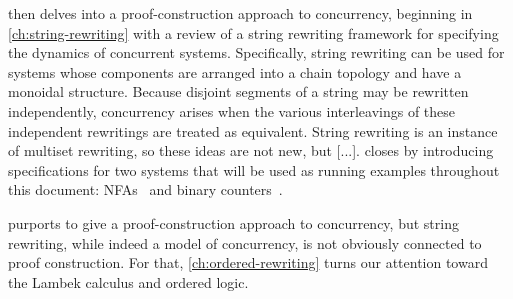  then delves into a proof-construction approach to concurrency, beginning in \cref{ch:string-rewriting} with a review of a string rewriting framework for specifying the dynamics of concurrent systems.
Specifically, string rewriting can be used for systems whose components are arranged into a chain topology and have a monoidal structure.
Because 
disjoint segments of a string may be rewritten independently,
concurrency arises when the various interleavings of these independent rewritings are treated as equivalent.
String rewriting is an instance of multiset rewriting, so these ideas are not new, but [...].\autocite{Meseguer:TCS92}
 closes by introducing
specifications for two systems that will be used as running examples throughout this document: \aclp*{NFA}~ and binary counters~.

 purports to give a proof-construction approach to concurrency, but string rewriting, while indeed a model of concurrency, is not obviously connected to proof construction.
For that, \cref{ch:ordered-rewriting} turns our attention toward the Lambek calculus and ordered logic.

